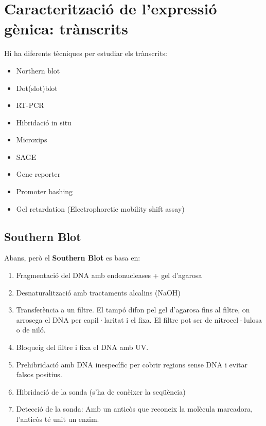 \section{Caracterització de l'expressió gènica: trànscrits}
\label{sec:caract-de-lexpr}

Hi ha diferents tècniques per estudiar els trànscrits:
\begin{itemize}
\item Northern blot
\item Dot(slot)blot
\item RT-PCR
\item Hibridació in situ
\item Microxips
\item SAGE
\item Gene reporter
\item Promoter bashing
\item Gel retardation (Electrophoretic mobility shift assay)
\end{itemize}

\subsection{Southern Blot}
\label{subsec:northern-blot}
Abans, però el \textbf{Southern Blot} es basa en:
\begin{enumerate}[\itembolasazules{\arabic*}]
\item Fragmentació del DNA amb endonucleases + gel d'agarosa
\item Desnaturalització amb tractaments alcalins (NaOH)
\item Transferència a un filtre. El tampó difon pel gel d'agarosa fins
  al filtre, on arrosega el DNA per capil·laritat i el fixa. El filtre
  pot ser de nitrocel·lulosa o de niló.
\item Bloqueig del filtre i fixa el DNA amb UV.
\item Prehibridació amb DNA inespecífic per cobrir regions sense DNA i
  evitar falsos positius.
\item Hibridació de la sonda (s'ha de conèixer la seqüència)
\item Detecció de la sonda: Amb un anticòs que reconeix la molècula
  marcadora, l'anticòs té unit un enzim.
\end{enumerate}

